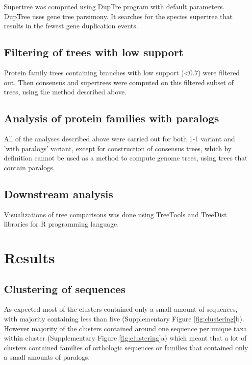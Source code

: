 \documentclass[two column, twoside, a4paper]{article}
\begin{document}
Supertree was computed using DupTre  program\autocite{Wehe2008} with default parameters. DupTree uses gene tree parsimony. It searches for the species supertree that results in the fewest gene duplication events.

\subsection{Filtering of trees with low support}

Protein family trees containing branches with low support (<0.7) were filtered out. Then consensus and supertrees were computed on this filtered subset of trees, using the method described above.

\subsection{Analysis of protein families with paralogs}

All of the analyses described above were carried out for both 1-1 variant and 'with paralogs' variant, except for construction of consensus trees, which by definition cannot be used as a method to compute genome trees, using trees that contain paralogs.

\subsection{Downstream analysis}

Visualizations of tree comparisons was done using TreeTools and TreeDist libraries for \textsf{R} programming language.

\section{Results}

\subsection{Clustering of sequences}

As expected most of the clusters contained only a small amount of sequences, with majority containing less than five (Supplementary Figure \ref{fig:clustering}b). However majority of the clusters contained around one sequence per unique taxa within cluster (Supplementary Figure \ref{fig:clustering}a) which meant that a lot of clusters contained families of orthologic sequences or families that contained only a small amounts of paralogs.
\end{document}
